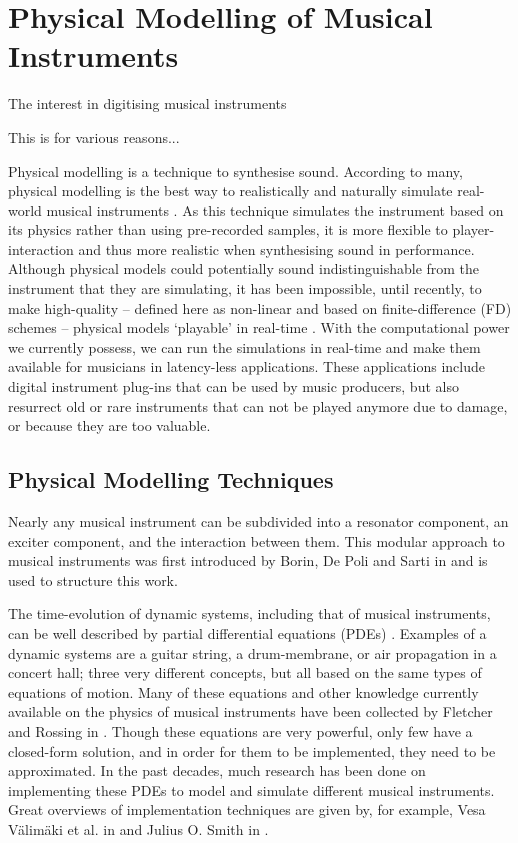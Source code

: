 \chapter{Physical Modelling of Musical Instruments}\label{ch:physMod}
The interest in digitising musical instruments 

This is for various reasons...

Physical modelling%
is a technique to synthesise sound. According to many, physical modelling is the best way to realistically and naturally simulate real-world musical instruments \cite{Valimaki2006, Smith2010b, theBible}. As this technique simulates the instrument based on its physics rather than using pre-recorded samples, it is more flexible to player-interaction and thus more realistic when synthesising sound in performance. Although physical models could potentially sound indistinguishable from the instrument that they are simulating, it has been impossible, until recently, to make high-quality -- defined here as non-linear and based on finite-difference (FD) schemes -- physical models ‘playable’ in real-time \cite{Smith2010a}. With the computational power we currently possess, we can run the simulations in real-time and make them available for musicians in latency-less applications. These applications include digital instrument plug-ins that can be used by music producers, but also resurrect old or rare instruments that can not be played anymore due to damage, or because they are too valuable. 


\section{Physical Modelling Techniques}\label{sec:physModTech}
Nearly any musical instrument can be subdivided into a resonator component, an exciter component, and the interaction between them. This modular approach to musical instruments was first introduced by Borin, De Poli and Sarti in \cite{Borin1989} and is used to structure this work.


The time-evolution of dynamic systems, including that of musical instruments, can be well described by partial differential equations (PDEs) \cite{Fletcher1998, theBible}. Examples of a dynamic systems are a guitar string, a drum-membrane, or air propagation in a concert hall; three very different concepts, but all based on the same types of equations of motion. Many of these equations and other knowledge currently available on the physics of musical instruments have been collected by Fletcher and Rossing in \cite{Fletcher1998}. Though these equations are very powerful, only few have a closed-form solution, and in order for them to be implemented, they need to be approximated. In the past decades, much research has been done on implementing these PDEs to model and simulate different musical instruments. Great overviews of implementation techniques are given by, for example, Vesa V{\"a}lim{\"a}ki et al. in \cite{Valimaki2006} and Julius O. Smith in \cite{Smith2010a, Smith2010b}. 

